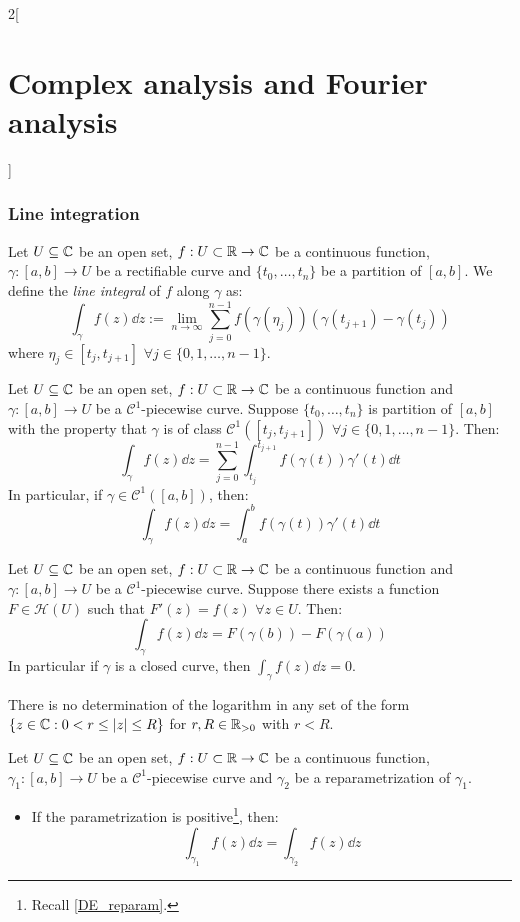 \documentclass[../../../main.tex]{subfiles}
\begin{document}
\begin{multicols}{2}[\section{Complex analysis and Fourier analysis}]
  \subsubsection{Line integration}
  \begin{definition}
    Let $U\subseteq \mathbb{C}$ be an open set, $f:U\subset\mathbb{R}\rightarrow\mathbb{C}$ be a continuous function, $\gamma:[a,b]\rightarrow U$ be a rectifiable curve and $\{t_0,\ldots,t_n\}$ be a partition of $[a,b]$. We define the \emph{line integral} of $f$ along $\gamma$ as: $$\int_\gamma f(z)\dd{z}:=\lim_{n\to\infty}\sum_{j=0}^{n-1}f(\gamma(\eta_j))(\gamma(t_{j+1})-\gamma(t_j))$$ where $\eta_j\in[t_j,t_{j+1}]$ $\forall j\in\{0,1,\ldots,n-1\}$.
  \end{definition}
  \begin{definition}
    Let $U\subseteq \mathbb{C}$ be an open set, $f:U\subset\mathbb{R}\rightarrow\mathbb{C}$ be a continuous function and $\gamma:[a,b]\rightarrow U$ be a $\mathcal{C}^1$-piecewise curve. Suppose $\{t_0,\ldots,t_n\}$ is partition of $[a,b]$ with the property that $\gamma$ is of class $\mathcal{C}^1([t_j,t_{j+1}])$ $\forall j\in\{0,1,\ldots,n-1\}$. Then: $$\int_\gamma f(z)\dd{z}=\sum_{j=0}^{n-1}\int_{t_j}^{t_{j+1}}f(\gamma(t))\gamma'(t)\dd{t}$$
    In particular, if $\gamma\in\mathcal{C}^1([a,b])$, then: $$\int_\gamma f(z)\dd{z}=\int_a^bf(\gamma(t))\gamma'(t)\dd{t}$$
  \end{definition}
  \begin{theorem}
    Let $U\subseteq \mathbb{C}$ be an open set, $f:U\subset\mathbb{R}\rightarrow\mathbb{C}$ be a continuous function and $\gamma:[a,b]\rightarrow U$ be a $\mathcal{C}^1$-piecewise curve. Suppose there exists a function $F\in\mathcal{H}(U)$ such that $F'(z)=f(z)$ $\forall z\in U$. Then:
    $$\int_\gamma f(z)\dd{z}=F(\gamma(b))-F(\gamma(a))$$ In particular if $\gamma$ is a closed curve, then $\int_\gamma f(z)\dd{z}=0$.
  \end{theorem}
  \begin{corollary}
    There is no determination of the logarithm in any set of the form $\{z\in\mathbb{C}:0<r\leq\abs{z}\leq R\}$ for $r,R\in\mathbb{R}_{> 0}$ with $r<R$.
  \end{corollary}
  \begin{proposition}
    Let $U\subseteq \mathbb{C}$ be an open set, $f:U\subset\mathbb{R}\rightarrow\mathbb{C}$ be a continuous function, $\gamma_1:[a,b]\rightarrow U$ be a $\mathcal{C}^1$-piecewise curve and $\gamma_2$ be a reparametrization of $\gamma_1$.
    \begin{itemize}
      \item If the parametrization is positive\footnote{Recall \cref{DE_reparam}.}, then: $$\int_{\gamma_1}f(z)\dd{z}=\int_{\gamma_2}f(z)\dd{z}$$

\end{itemize}
\end{proposition}
\end{multicols}
\end{document}
